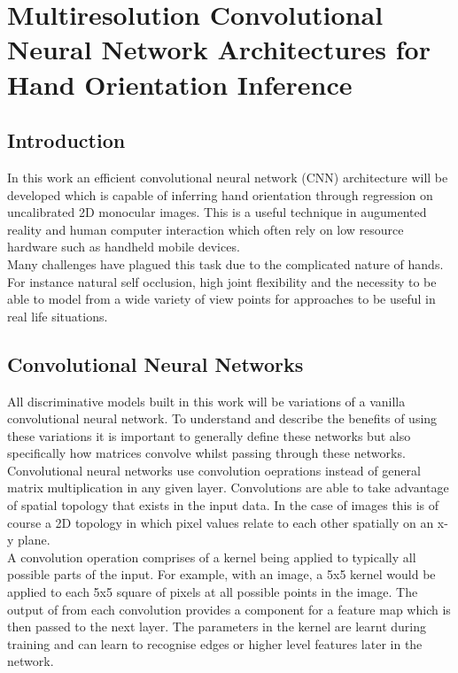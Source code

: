 \documentclass{article}
\begin{document}
\section*{Multiresolution Convolutional Neural Network Architectures for Hand Orientation Inference}

\subsection*{Introduction}
In this work an efficient convolutional neural network (CNN) architecture will be developed which is capable of inferring hand orientation through regression on uncalibrated 2D monocular images. This is a useful technique in augumented reality and human computer interaction which often rely on low resource hardware such as handheld mobile devices.\\

Many challenges have plagued this task due to the complicated nature of hands. For instance natural self occlusion, high joint flexibility and the necessity to be able to model from a wide variety of view points for approaches to be useful in real life situations. \\

\subsection*{Convolutional Neural Networks}
All discriminative models built in this work will be variations of a vanilla convolutional neural network. To understand and describe the benefits of using these variations it is important to generally define these networks but also specifically how matrices convolve whilst passing through these networks.\\

Convolutional neural networks use convolution oeprations instead of general matrix multiplication in any given layer. Convolutions are able to take advantage of spatial topology that exists in the input data. In the case of images this is of course a 2D topology in which pixel values relate to each other spatially on an x-y plane.\\

A convolution operation comprises of a kernel being applied to  typically all possible parts of the input. For example, with an image, a 5x5 kernel would be applied to each 5x5 square of pixels at all possible points in the image. The output of from each convolution provides a component for a feature map which is then passed to the next layer. The parameters in the kernel are learnt during training and can learn to recognise edges or higher level features later in the network.\\
\end{document}
